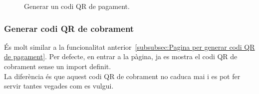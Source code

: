 \documentclass[a4paper,12pt,twoside]{ThesisStyle}
\begin{document}
\begin{figure}[h]
    \caption{Generar un codi QR de pagament.}
    \label{fig: Generar codi QR de pagament}
\end{figure}

\clearpage

\subsubsection{Generar codi QR de cobrament}
\label{subsubsec:Generar codi QR de cobrament}

És molt similar a la funcionalitat anterior~\ref{subsubsec:Pagina per generar codi QR de pagament}. Per defecte, en entrar a la pàgina, ja es mostra el codi QR de cobrament sense un import definit.\\

La diferència és que aquest codi QR de cobrament no caduca mai i es pot fer servir tantes vegades com es vulgui.
\end{document}
